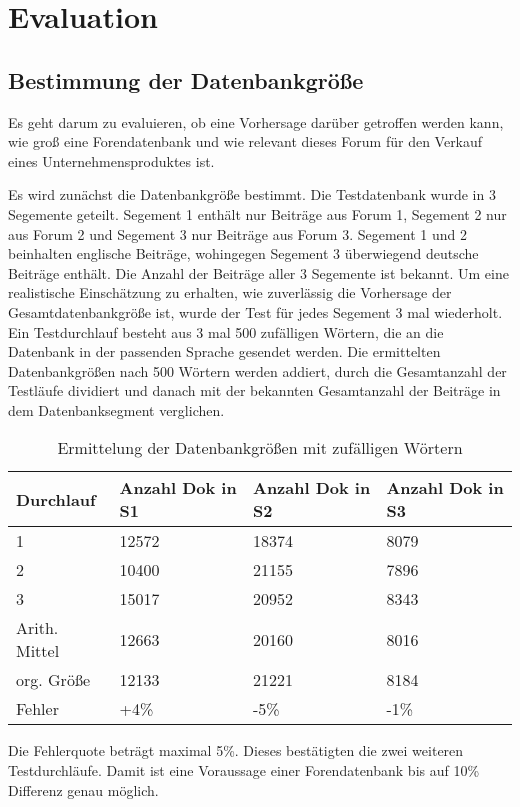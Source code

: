 \section{Evaluation}
\subsection{Bestimmung der Datenbankgröße}

Es geht darum zu evaluieren, ob eine Vorhersage darüber getroffen werden kann, wie groß eine Forendatenbank und wie relevant dieses Forum für den Verkauf eines Unternehmensproduktes ist.

Es wird zunächst die Datenbankgröße bestimmt. Die Testdatenbank wurde in 3 Segemente geteilt. Segement 1 enthält nur Beiträge aus Forum 1, Segement 2 nur aus Forum 2 und Segement 3 nur Beiträge aus Forum 3. 
Segement 1 und 2 beinhalten englische Beiträge, wohingegen Segement 3 überwiegend deutsche Beiträge enthält. Die Anzahl der Beiträge aller 3 Segemente ist bekannt. Um eine realistische Einschätzung zu erhalten, wie zuverlässig die Vorhersage der Gesamtdatenbankgröße ist, wurde der Test für jedes Segement 3 mal wiederholt. Ein Testdurchlauf besteht aus 3 mal 500 zufälligen Wörtern, die an die Datenbank in der passenden Sprache gesendet werden. Die ermittelten Datenbankgrößen nach 500 Wörtern werden addiert, durch die Gesamtanzahl der Testläufe dividiert und danach mit der bekannten Gesamtanzahl der Beiträge in dem Datenbanksegment verglichen.

\begin{table}[h!]
\begin{tabular}{ | p{3cm} | p{3cm} | p{3cm}| p{3cm} |} \hline
\textbf{Durchlauf} & \textbf{Anzahl Dok in S1} & \textbf{Anzahl Dok in S2} & \textbf{Anzahl Dok in S3} \\ \hline
1 & 12572 & 18374 & 8079 \\ \hline
2 & 10400 & 21155 & 7896 \\ \hline
3 & 15017 & 20952 & 8343 \\ \hline
Arith. Mittel & 12663 & 20160 & 8016 \\ \hline
org. Größe & 12133 & 21221 & 8184 \\ \hline
Fehler & +4\% & -5\% & -1\% \\ \hline
\end{tabular}
\caption{Ermittelung der Datenbankgrößen mit zufälligen Wörtern}
\end{table}

Die Fehlerquote beträgt maximal 5\%. Dieses bestätigten die zwei weiteren Testdurchläufe. Damit ist eine Voraussage einer Forendatenbank bis auf 10\% Differenz genau möglich.
